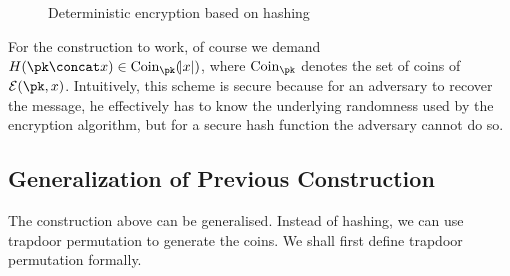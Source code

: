 \documentclass[10pt]{book}
\begin{document}
\begin{figure}
\begin{pchstack}[center]
	
	\pchspace
	
	
	\pchspace
	
\end{pchstack}

\caption{Deterministic encryption based on hashing}
\end{figure}


For the construction to work, of course we demand $H(\pk \concat x) \in \text{Coin}_{\pk}(\abs{x})$, where $\text{Coin}_{\pk}$ denotes the set of coins of $\mathcal{E}(\pk, x)$. Intuitively, this scheme is secure because for an adversary to recover the message, he effectively has to know the underlying randomness used by the encryption algorithm, but for a secure hash function the adversary cannot do so.


\subsection{Generalization of Previous Construction}
The construction above can be generalised. Instead of hashing, we can use trapdoor permutation to generate the coins. We shall first define trapdoor permutation formally.
\end{document}
